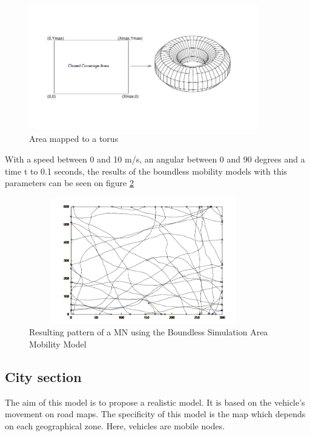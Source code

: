 \begin{figure}[h]
\center
\includegraphics[width=10cm,height=55mm]{../images/boundlessmobilitymodel1.png}
\caption{\label{BoundlessFig}Area mapped to a torus\cite{SurveyMobilityModelsAdHoc1}}
\end{figure}


With a speed between 0 and 10 m/s, an angular between 0 and 90 degrees and a time t to 0.1 seconds, the results of the boundless mobility models with this parameters can be seen on figure \ref{BoundlessFig2}\\

\begin{figure}[h]
\center
\includegraphics[width=10cm,height=55mm]{../images/boundlessmobilitymodel2.png}
\caption{\label{BoundlessFig2}Resulting pattern of a MN using the Boundless Simulation Area Mobility Model\cite{SurveyMobilityModelsAdHoc1}}
\end{figure}

\newpage

\subsection{City section}

The aim of this model is to propose a realistic model. It is based on the vehicle's movement on road maps. The specificity of this model is the map which depends on each geographical zone. Here, vehicles are mobile nodes.\\

